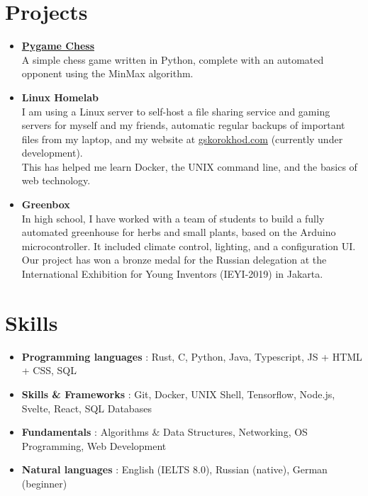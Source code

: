 \documentclass[letterpaper,11pt]{article}
\newcommand{\resumeItem}[2]{
\item\small{
    \textbf{#1}{ #2 \vspace{-2pt}}
  }
}
\newcommand{\resumeSubItem}[2]{\resumeItem{#1}{#2}\vspace{-4pt}}
\newcommand{\resumeSubHeadingListStart}{
\begin{itemize}[leftmargin=*]}
\newcommand{\resumeSubHeadingListEnd}{
  \end{itemize}}
\begin{document}
\section{Projects}
\resumeSubHeadingListStart
\resumeSubItem{\href{https://github.com/gskorokhod/PygameChess}{Pygame
Chess} \\}
{A simple chess game written in Python, complete with an automated
opponent using the MinMax algorithm.}
\resumeSubItem{Linux Homelab \\}
{I am using a Linux server to self-host a file sharing service and
  gaming servers for myself and my friends, automatic regular backups
  of important files from my laptop, and my website at
  \href{https://gskorokhod.com}{gskorokhod.com} (currently under
  development).\\ This has helped me learn Docker, the UNIX command
line, and the basics of web technology. }
\resumeSubItem{Greenbox \\}
{In high school, I have worked with a team of students to build a
  fully automated greenhouse for herbs and small plants, based on the
  Arduino microcontroller. It included climate control, lighting, and a
  configuration UI. Our project has won a bronze medal for the Russian
  delegation at the International Exhibition for Young Inventors
(IEYI-2019) in Jakarta.}
\resumeSubHeadingListEnd

\section{Skills}
\resumeSubHeadingListStart
\resumeSubItem{Programming languages}{: Rust, C, Python, Java,
Typescript, JS + HTML + CSS, SQL }
\resumeSubItem{Skills \& Frameworks}{: Git, Docker, UNIX Shell,
Tensorflow, Node.js, Svelte, React, SQL Databases }
\resumeSubItem{Fundamentals}{: Algorithms \& Data Structures,
Networking, OS Programming, Web Development }
\resumeSubItem{Natural languages}{: English (IELTS 8.0), Russian
(native), German (beginner) }
\resumeSubHeadingListEnd
\end{document}
